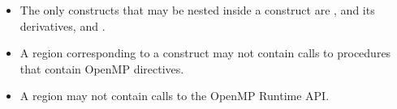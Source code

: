 \begin{itemize}

\item The only constructs that may be nested inside a  construct
    are ,  and its derivatives, and .

\item A  region corresponding to a  construct may not contain calls to procedures that contain
OpenMP directives. 

\item A  region  may not contain calls to the OpenMP Runtime
    API.


\end{itemize}
